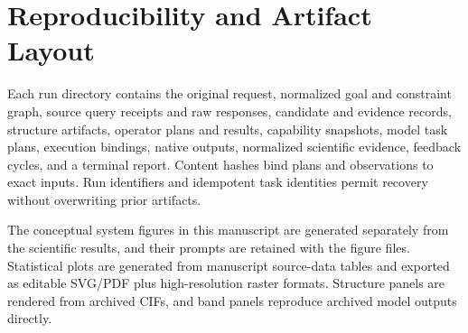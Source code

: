 \section{Reproducibility and Artifact Layout}
\label{app:reproducibility}

Each run directory contains the original request, normalized goal and constraint graph, source query receipts and raw responses, candidate and evidence records, structure artifacts, operator plans and results, capability snapshots, model task plans, execution bindings, native outputs, normalized scientific evidence, feedback cycles, and a terminal report.  Content hashes bind plans and observations to exact inputs.  Run identifiers and idempotent task identities permit recovery without overwriting prior artifacts.

The conceptual system figures in this manuscript are generated separately from the scientific results, and their prompts are retained with the figure files.  Statistical plots are generated from manuscript source-data tables and exported as editable SVG/PDF plus high-resolution raster formats.  Structure panels are rendered from archived CIFs, and band panels reproduce archived model outputs directly.
